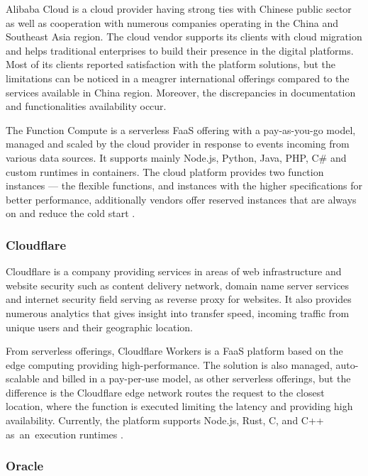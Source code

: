 Alibaba Cloud is a cloud provider having strong ties with Chinese public sector as well as cooperation with numerous companies operating in the China and Southeast Asia region. The cloud vendor supports its clients with cloud migration and helps traditional enterprises to build their presence in the digital platforms. Most of its clients reported satisfaction with the platform solutions, but the limitations can be noticed in a meagrer international offerings compared to the services available in China region. Moreover, the discrepancies in documentation and functionalities availability \cite{Gartner} occur.

The Function Compute is a serverless FaaS offering with a pay-as-you-go model, managed and scaled by the cloud provider in response to events incoming from various data sources. It supports mainly Node.js, Python, Java, PHP, C\# and custom runtimes in containers. The cloud platform provides two function instances --- the flexible functions, and instances with the higher specifications for better performance, additionally vendors offer reserved instances that are always on and reduce the cold start \cite{AlibabaFunctionCompute}.

\subsubsection{Cloudflare}

Cloudflare is a company providing services in areas of web infrastructure and website security such as content delivery network, domain name server services and internet security field serving as reverse proxy for websites. It also provides numerous analytics that gives insight into transfer speed, incoming traffic from unique users and their geographic location.

From serverless offerings, Cloudflare Workers is a FaaS platform based on the edge computing providing high-performance. The solution is also managed, auto-scalable and billed in a pay-per-use model, as other serverless offerings, but the difference is the Cloudflare edge network routes the request to the closest location, where the function is executed limiting the latency and providing high availability. Currently, the platform supports Node.js, Rust, C, and C++ as~an~execution runtimes \cite{CloudflareWorkers}.

\subsubsection{Oracle}

